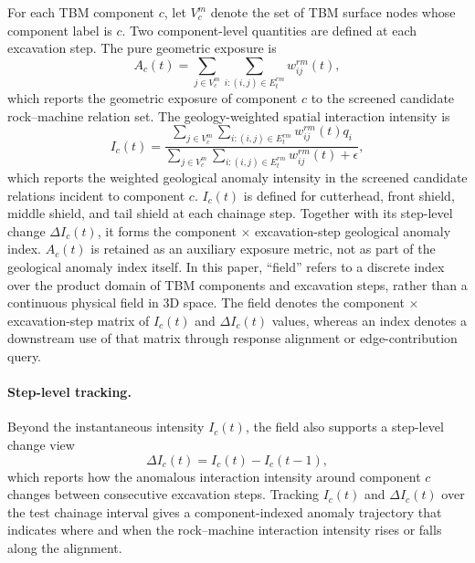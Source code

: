 For each TBM component $c$, let $V_c^m$ denote the set of TBM surface nodes
whose component label is $c$. Two component-level quantities are defined at
each excavation step.
The pure geometric exposure is
\[
A_c(t)=
\sum_{j\in V_c^m}
\sum_{i:(i,j)\in E_t^{rm}}
w_{ij}^{rm}(t),
\]
which reports the geometric exposure of component $c$ to the screened
candidate rock--machine relation set. The geology-weighted spatial interaction
intensity is
\[
I_c(t)=
\frac{
\sum_{j\in V_c^m}
\sum_{i:(i,j)\in E_t^{rm}}
w_{ij}^{rm}(t)q_i
}{
\sum_{j\in V_c^m}
\sum_{i:(i,j)\in E_t^{rm}}
w_{ij}^{rm}(t)+\epsilon
},
\]
which reports the weighted geological anomaly intensity in the screened
candidate relations incident to component $c$.
$I_c(t)$ is defined for cutterhead, front shield, middle shield, and tail
shield at each chainage step. Together with its step-level change
$\Delta I_c(t)$, it forms the component $\times$ excavation-step geological
anomaly index. $A_c(t)$ is retained as an auxiliary exposure metric, not as
part of the geological anomaly index itself. In this paper, ``field'' refers to a
discrete index over the product domain of TBM components and excavation
steps, rather than a continuous physical field in 3D space. The field denotes
the component $\times$ excavation-step matrix of $I_c(t)$ and $\Delta I_c(t)$
values, whereas an index denotes a downstream use of that matrix through
response alignment or edge-contribution query.

\paragraph{Step-level tracking.} Beyond the instantaneous intensity
$I_c(t)$, the field also supports a step-level change view
\[
\Delta I_c(t) = I_c(t) - I_c(t-1),
\]
which reports how the anomalous interaction intensity around component $c$
changes between consecutive excavation steps. Tracking $I_c(t)$ and
$\Delta I_c(t)$ over the test chainage interval gives a component-indexed
anomaly trajectory that indicates where and when the rock--machine
interaction intensity rises or falls along the alignment.

